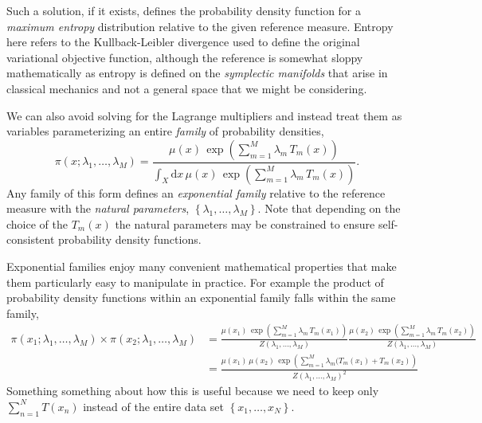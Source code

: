 \documentclass[11pt, oneside]{article}
\begin{document}
Such a solution, if it exists, defines the probability density function 
for a \emph{maximum entropy} distribution relative to the given reference
measure.  Entropy here refers to the Kullback-Leibler divergence used
to define the original variational objective function, although the
reference is somewhat sloppy mathematically as entropy is defined on
the \emph{symplectic manifolds} that arise in classical mechanics and
not a general space that we might be considering.

We can also avoid solving for the Lagrange multipliers and instead
treat them as variables parameterizing an entire \emph{family} of
probability densities,
%
\begin{equation*}
\pi(x; \lambda_{1}, \ldots, \lambda_{M}) = 
\frac{ \mu(x) \, \exp \left( \sum_{m = 1}^{M} \lambda_{m} \, T_{m}(x) \right) }
{ \int_{X} \mathrm{d} x \,
\mu(x) \, \exp \left( \sum_{m = 1}^{M} \lambda_{m} \, T_{m}(x) \right) }.
\end{equation*}
%
Any family of this form defines an \emph{exponential family}
relative to the reference measure with the \emph{natural parameters}, 
$\left\{ \lambda_{1}, \ldots, \lambda_{M} \right\}$.  Note that
depending on the choice of the $T_{m}(x)$ the natural parameters may 
be constrained to ensure self-consistent probability density functions.

Exponential families enjoy many convenient mathematical properties 
that make them particularly easy to manipulate in practice.  For 
example the product of probability density functions within an
exponential family falls within the same family,
%
\begin{align*}
\pi(x_{1}; \lambda_{1}, \ldots, \lambda_{M}) 
\times
\pi(x_{2}; \lambda_{1}, \ldots, \lambda_{M}) 
&=
\frac{ \mu(x_{1}) \, \exp \left( \sum_{m = 1}^{M} \lambda_{m} \, T_{m}(x_{1}) \right) }
{ Z(\lambda_{1}, \ldots, \lambda_{M}) }
\frac{ \mu(x_{2}) \, \exp \left( \sum_{m = 1}^{M} \lambda_{m} \, T_{m}(x_{2}) \right) }
{ Z(\lambda_{1}, \ldots, \lambda_{M}) }
\\
&=
\frac{ \mu(x_{1}) \, \mu(x_{2}) \, \exp \left( \sum_{m = 1}^{M} \lambda_{m} ( T_{m}(x_{1}) + T_{m}(x_{2}) \right) }
{ Z(\lambda_{1}, \ldots, \lambda_{M})^{2} }
\end{align*}
%
Something something about how this is useful because we need
to keep only $\sum_{n = 1}^{N} T(x_{n})$ instead of the 
entire data set $\left\{x_{1}, \ldots, x_{N}\right\}$.
\end{document}
